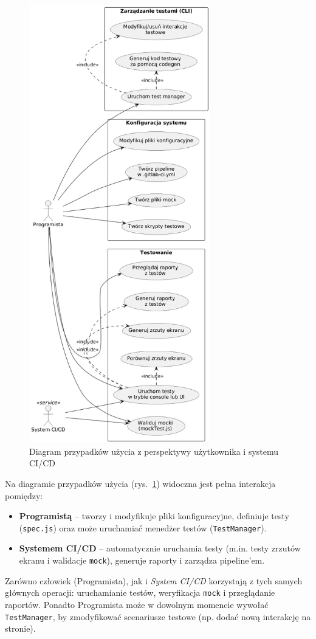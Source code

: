 \documentclass[12pt]{report}
\begin{document}
\begin{figure}[H]
\centering
\includegraphics[width=0.7\textwidth]{use-uml.png}
\caption{Diagram przypadków użycia z perspektywy użytkownika i systemu CI/CD}
\label{fig:diag-use-case}
\end{figure}

Na diagramie przypadków użycia (rys.~\ref{fig:diag-use-case}) widoczna jest pełna interakcja pomiędzy:
\begin{itemize}
    \item \textbf{Programistą} -- tworzy i modyfikuje pliki konfiguracyjne, definiuje testy (\texttt{spec.js}) oraz może uruchamiać menedżer testów (\texttt{TestManager}).
    \item \textbf{Systemem CI/CD} -- automatycznie uruchamia testy (m.in. testy zrzutów ekranu i walidacje \texttt{mock}), generuje raporty i zarządza pipeline’em.
\end{itemize}
Zarówno człowiek (Programista), jak i \emph{System CI/CD} korzystają z tych samych głównych operacji: uruchamianie testów, weryfikacja \texttt{mock} i przeglądanie raportów. Ponadto Programista może w dowolnym momencie wywołać \texttt{TestManager}, by zmodyfikować scenariusze testowe (np. dodać nową interakcję na stronie).
\end{document}
